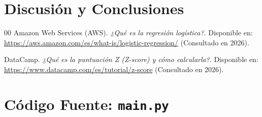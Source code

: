 \documentclass[conference]{IEEEtran}
\begin{document}
	\section{Discusión y Conclusiones}
	
	\begin{thebibliography}{00}
		Amazon Web Services (AWS). 
		\textit{¿Qué es la regresión logística?}. 
		Disponible en: \url{https://aws.amazon.com/es/what-is/logistic-regression/} (Consultado en 2026).
		
		DataCamp. 
		\textit{¿Qué es la puntuación Z (Z-score) y cómo calcularla?}. 
		Disponible en: \url{https://www.datacamp.com/es/tutorial/z-score} (Consultado en 2026).
	\end{thebibliography}
	
	\clearpage
	\onecolumn
	\appendices
	\section{Código Fuente: \texttt{main.py}}
	\label{app:codigo}
	
	
\end{document}
